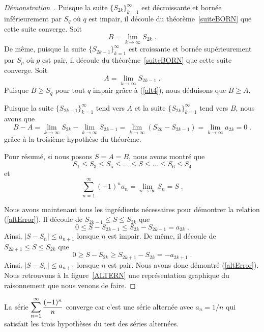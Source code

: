 {\begin{proof}[Démonstration\ \theory]
Puisque la suite $\{S_{2k}\}_{k=1}^\infty$ est décroissante et bornée
inférieurement par $S_q$ où $q$ est impair, il découle du
théorème~\ref{suiteBORN} que cette suite converge.  Soit
\[
B = \lim_{k\rightarrow \infty} S_{2k} \; .
\]
De même, puisque la suite $\{S_{2k-1}\}_{k=1}^\infty$ est croissante et
bornée supérieurement par $S_p$ où $p$ est pair, il découle du
théorème~\ref{suiteBORN} que cette suite converge.  Soit
\[
A = \lim_{k\rightarrow \infty} S_{2k-1} \; .
\]
Puisque $B \geq S_q$ pour tout $q$ impair grâce à (\ref{alt4}), nous
déduisons que $B \geq A$.

Puisque la suite $\{S_{2k-1}\}_{k=1}^\infty$ tend vers $A$ et la
suite $\{S_{2k}\}_{k=1}^\infty$ tend vers $B$, nous avons que
\[
B-A = \lim_{k\rightarrow \infty} S_{2k} - \lim_{k\rightarrow \infty} S_{2k-1}
= \lim_{k\rightarrow \infty} \left( S_{2k} - S_{2k-1} \right)
= \lim_{k\rightarrow \infty} a_{2k} =0 \; .
\]
grâce à la troisième hypothèse du théorème.

Pour résumé, si nous posons $S=A=B$, nous avons montré que
\[
S_1 \leq S_3 \leq S_5 \leq \ldots \leq S \leq \ldots \leq S_6 \leq S_4
\]
et
\[
\sum_{n=1}^\infty (-1)^n a_n = \lim_{n\rightarrow \infty} S_n = S \; .
\]

Nous avons maintenant tous les ingrédients nécessaires pour démontrer la
relation (\ref{altError}).  Il découle de $S_{2k-1} \leq S \leq S_{2k}$
que
\[
0 \leq S - S_{2k-1} \leq S_{2k} - S_{2k-1} = a_{2k} \; .
\]
Ainsi, $|S- S_n| \leq a_{n+1}$ lorsque $n$ est impair.  De même, il
découle de $S_{2k+1} \leq S \leq S_{2k}$ que
\[
0 \geq S - S_{2k} \geq S_{2k+1} - S_{2k} = -a_{2k+1} \; .
\]
Ainsi, $|S-S_n| \leq a_{n+1}$ lorsque $n$ est pair.  Nous avons donc démontré
(\ref{altError}).  Nous retrouvons à la figure~\ref{ALTERN} une
représentation graphique du raisonnement que nous venons de faire.
\end{proof}


\begin{egg}
La série $\displaystyle \sum_{n=1}^\infty \frac{(-1)^n}{n}$ converge
car c'est une série alternée avec $a_n = 1/n$ qui satisfait les trois
hypothèses du test des séries alternées.
\end{egg}

}
